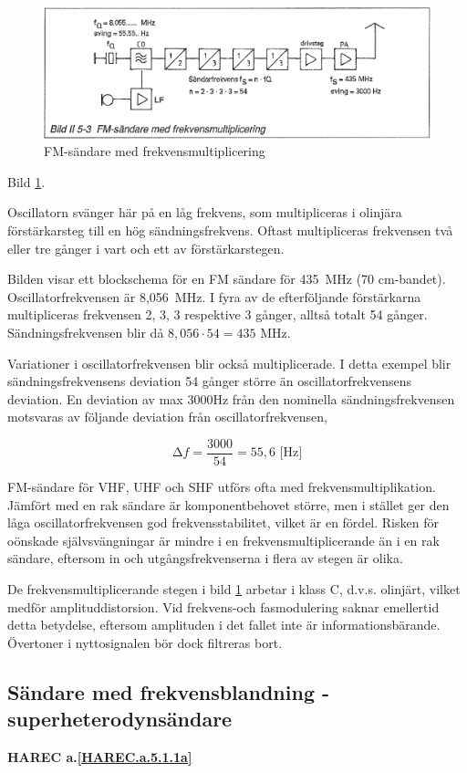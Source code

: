 \begin{figure}
  \includegraphics[width=\textwidth]{images/bild_2_5-03}
  \caption{FM-sändare med frekvensmultiplicering}
  \label{fig:bildII5-3}
\end{figure}

Bild \ref{fig:bildII5-3}.

Oscillatorn svänger här på en låg frekvens, som multipliceras i
olinjära förstärkarsteg till en hög sändningsfrekvens. Oftast
multipliceras frekvensen två eller tre gånger i vart och ett av
förstärkarstegen.

Bilden visar ett blockschema för en FM sändare för 435~MHz (70
cm-bandet). Oscillatorfrekvensen är 8,056~MHz. I fyra av de
efterföljande förstärkarna multipliceras frekvensen 2, 3, 3 respektive
3 gånger, alltså totalt 54 gånger. Sändningsfrekvensen blir då \(8,056
\cdot 54 = 435\) MHz.

Variationer i oscillatorfrekvensen blir också multiplicerade. I detta
exempel blir sändningsfrekvensens deviation 54 gånger större än
oscillatorfrekvensens deviation. En deviation av max 3000Hz från den
nominella sändningsfrekvensen motsvaras av följande deviation från
oscillatorfrekvensen,

\[∆f = \frac{3000}{54} = 55,6\text{ [Hz]}\]

FM-sändare för VHF, UHF och SHF utförs ofta med
frekvensmultiplikation. Jämfört med en rak sändare är komponentbehovet
större, men i stället ger den låga oscillatorfrekvensen god
frekvensstabilitet, vilket är en fördel. Risken för oönskade
självsvängningar är mindre i en frekvensmultiplicerande än i en rak
sändare, eftersom in och utgångsfrekvenserna i flera av stegen är
olika.

De frekvensmultiplicerande stegen i bild \ref{fig:bildII5-3} arbetar i klass C,
d.v.s. olinjärt, vilket medför amplituddistorsion. Vid frekvens-och
fasmodulering saknar emellertid detta betydelse, eftersom amplituden i
det fallet inte är informationsbärande. Övertoner i nyttosignalen bör
dock filtreras bort.

\subsection{Sändare med frekvensblandning - superheterodynsändare}
\textbf{HAREC a.\ref{HAREC.a.5.1.1a}\label{myHAREC.a.5.1.1a}}

